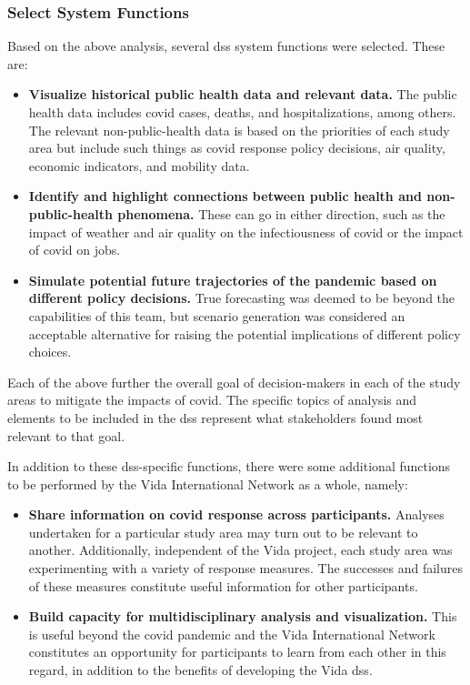 \begin{landscape}
\begin{longtable}{| C{2cm} |  L{5.2cm} | L{5.2cm} | L{5.2cm} |}
\end{longtable}

\end{landscape}


\subsubsection{Select System Functions}

Based on the above analysis, several \ac{dss} system functions were selected. These are:

\begin{itemize}[itemsep=0pt,parsep=0pt]
	\item{\textbf{Visualize historical public health data and relevant data.} The public health data includes \ac{covid} cases, deaths, and hospitalizations, among others. The relevant non-public-health data is based on the priorities of each study area but include such things as \ac{covid} response policy decisions, air quality, economic indicators, and mobility data.}
	\item{\textbf{Identify and highlight connections between public health and non-public-health phenomena.} These can go in either direction, such as the impact of weather and air quality on the infectiousness of \ac{covid} or the impact of \ac{covid} on jobs.}
	\item{\textbf{Simulate potential future trajectories of the pandemic based on different policy decisions.} True forecasting was deemed to be beyond the capabilities of this team, but scenario generation was considered an acceptable alternative for raising the potential implications of different policy choices.} 
\end{itemize}

Each of the above further the overall goal of decision-makers in each of the study areas to mitigate the impacts of \ac{covid}. The specific topics of analysis and elements to be included in the \ac{dss} represent what stakeholders found most relevant to that goal.

In addition to these \ac{dss}-specific functions, there were some additional functions to be performed by the Vida International Network as a whole, namely:

\begin{itemize}[itemsep=0pt,parsep=0pt]
	\item{\textbf{Share information on \ac{covid} response across participants.} Analyses undertaken for a particular study area may turn out to be relevant to another. Additionally, independent of the Vida project, each study area was experimenting with a variety of response measures. The successes and failures of these measures constitute useful information for other participants.}
	\item{\textbf{Build capacity for multidisciplinary analysis and visualization.} This is useful beyond the \ac{covid} pandemic and the Vida International Network constitutes an opportunity for participants to learn from each other in this regard, in addition to the benefits of developing the Vida \ac{dss}.}
\end{itemize}

